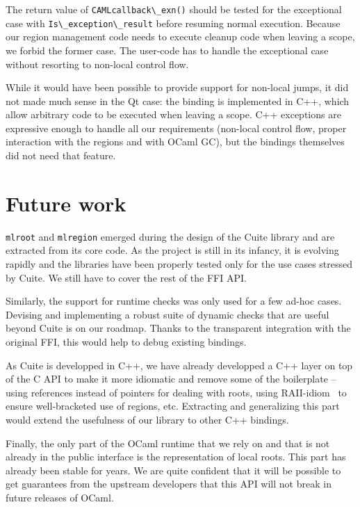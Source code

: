 \documentclass[a4paper]{easychair}
\newcommand{\cpp}[1]{\lstinline[style=C++]{#1}}
\begin{document}
The return value of \cpp{CAMLcallback\_exn()} should be tested for
the exceptional case with \cpp{Is\_exception\_result} before resuming
normal execution.  Because our region management code needs to execute cleanup
code when leaving a scope, we forbid the former case. The user-code has to
handle the exceptional case without resorting to non-local control flow.

While it would have been possible to provide support for non-local
jumps, it did not made much sense in the Qt case: the binding is
implemented in C++, which allow arbitrary code to be executed when
leaving a scope. C++ exceptions are expressive enough to handle all our
requirements (non-local control flow, proper interaction with the
regions and with OCaml GC), but the bindings themselves did not need
that feature.

\section{Future work}

\cpp{mlroot} and \cpp{mlregion} emerged during the design of the Cuite library
and are extracted from its core code.  As the project is still in its infancy,
it is evolving rapidly and the libraries have been properly tested only for the
use cases stressed by Cuite. We still have to cover the rest of the FFI API.

Similarly, the support for runtime checks was only used for a few ad-hoc
cases. Devising and implementing a robust suite of dynamic checks that are
useful beyond Cuite is on our roadmap. Thanks to the transparent integration
with the original FFI, this would help to debug existing bindings.

As Cuite is developped in C++, we have already developped a C++ layer on top of
the C API to make it more idiomatic and remove some of the boilerplate --
using references instead of pointers for dealing with roots, using
RAII-idiom~\citep{Stroustrup:1995:DEC:193198} to ensure well-bracketed use
of regions, etc.
Extracting and generalizing this part would extend the usefulness of our
library to other C++ bindings.

Finally, the only part of the OCaml runtime that we rely on and that is not
already in the public interface is the representation of local roots. 
This part has already been stable for years. We are quite confident that it
will be possible to get guarantees from the upstream developers that this API
will not break in future releases of OCaml.
\end{document}
